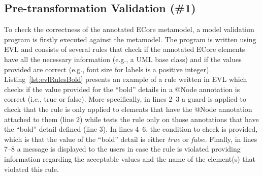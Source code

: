 \subsection{Pre-transformation Validation (\#1)}
To check the correctness of the annotated ECore metamodel, a model validation program is firstly executed against the metamodel.
The program is written using EVL and consists of several rules that check if the annotated ECore elements have all the necessary information (e.g., a UML base class) and if the values provided are correct (e.g., font size for labels is a positive integer). 
Listing~\ref{lst:evlRulesBold} presents an example of a rule written in EVL which checks if the value provided for the ``bold'' details in a @Node annotation is correct (i.e., true or false). More specifically, in lines 2--3 a guard is applied to check that the rule is only applied to elements that have the @Node annotation attached to them (line 2) while tests the rule only on those annotations that have the ``bold'' detail defined (line 3). 
In lines 4--6, the condition to check is provided, which is that the value of the ``bold'' detail is either \textit{true} or \textit{false}. 
Finally, in lines 7--8 a message is displayed to the users in case the rule is violated providing information regarding the acceptable values and the name of the element(s) that violated this rule.



